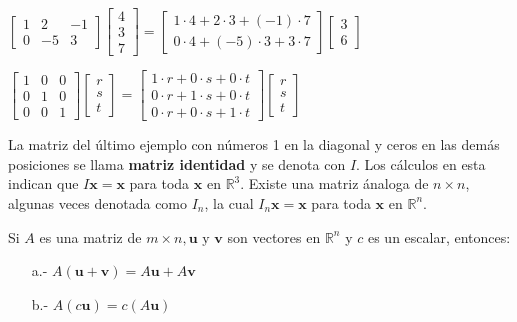 \documentclass{article}
\begin{document}
$\begin{bmatrix}
    1 & 2 & -1\\
    0 & -5 & 3
\end{bmatrix}
\begin{bmatrix} 4\\3\\7 \end{bmatrix}
=\begin{bmatrix}
    1\cdot4 + 2\cdot3 + (-1)\cdot7\\
    0\cdot4 + (-5)\cdot3 + 3\cdot7 
\end{bmatrix}
\begin{bmatrix} 3\\6 \end{bmatrix}$

$\begin{bmatrix}
    1 & 0 & 0\\
    0 & 1 & 0\\
    0 & 0 & 1
\end{bmatrix}
\begin{bmatrix} r\\s\\t \end{bmatrix}
=\begin{bmatrix}
    1\cdot r + 0\cdot s + 0\cdot t\\
    0\cdot r + 1\cdot s + 0\cdot t\\
    0\cdot r + 0\cdot s + 1\cdot t
\end{bmatrix}
\begin{bmatrix} r\\s\\t \end{bmatrix}$

La matriz del último ejemplo con números 1 en la diagonal y ceros en las demás posiciones se llama \textbf{matriz identidad} y se denota con $I$. Los cálculos en esta indican que $I\mathbf{x} =  \mathbf{x}$ para toda $\mathbf{x}$ en $\mathbb{R}^3$. Existe una matriz ánaloga de $n \times n$, algunas veces denotada como $I_n$, la cual $I_n\mathbf{x} = \mathbf{x}$ para toda $\mathbf{x}$ en $\mathbb{R}^n$.

\begin{tcolorbox}[colback=red!10!white, colframe=red!70!black, title=Propiedades del producto matriz-vector $A\mathbf{x}$]
    Si $A$ es una matriz de $m\times n, \mathbf{u} \text{ y } \mathbf{v}$ son vectores en $\mathbb{R}^n$ y $c$ es un escalar, entonces: 
    \begin{itemize}
        \item[a.-]  $A(\mathbf{u} + \mathbf{v}) = A\mathbf{u} + A\mathbf{v}$
        \item[b.-] $A(c\mathbf{u}) = c(A\mathbf{u})$ 
    \end{itemize}

\end{tcolorbox}
\end{document}
